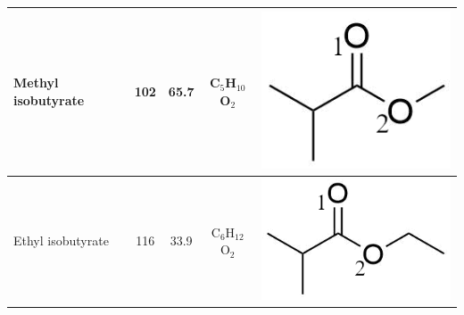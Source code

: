 \begin{table}
\begin{tabular}{lcccc}
\midrule
Methyl isobutyrate &   102 &65.7&   C$_{5}$H$_{10}$O$_2$ & \begin{minipage}[c]{0.13\linewidth}\centering \includegraphics[width=0.8\linewidth]{pics/cocaine-chapter/MEisobuty_struct.png}\end{minipage}\\ 
\midrule
Ethyl isobutyrate &  116 &33.9&   C$_{6}$H$_{12}$O$_2$ & \begin{minipage}[c]{0.17\linewidth}\centering \includegraphics[width=0.8\linewidth]{pics/cocaine-chapter/ETisobuty_struct.png}\end{minipage} \\
\bottomrule
\end{tabular}
\label{tab:COC_structs2}
\end{table}



